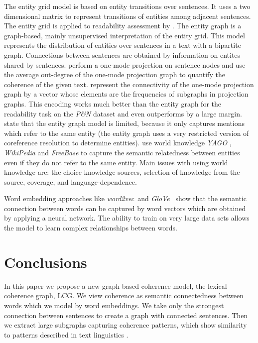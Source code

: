 The entity grid model \cite{barzilay08} is based on entity transitions
over sentences. It uses a two dimensional matrix to represent
transitions of entities among adjacent sentences. The entity grid is
applied to readability assessment by . The entity
graph \cite{guinaudeau13} is a graph-based, mainly unsupervised
interpretation of the entity grid. This model represents the
distribution of entities over sentences in a text with a bipartite
graph. Connections between sentences are obtained by information on
entites shared by sentences.  perform a one-mode
projection on sentence nodes and use the average out-degree of
the one-mode projection graph to quantify the coherence of the given
text.  represent the connectivity of the one-mode
projection graph by a vector whose elements are the frequencies of
subgraphs in projection graphs. This encoding works much better
than the entity graph for the readability task on the \emph{P\&N}
dataset and even outperforms  by a large margin.
 state that the entity graph model is limited,
because it only captures mentions which refer to the same entity (the
entity graph uses a very restricted version of coreference resolution
to determine entities).  use world knowledge
\emph{YAGO} \cite{hoffart13}, \emph{WikiPedia} \cite{denoyer06} and
\emph{FreeBase} \cite{bollacker08} to capture the semantic relatedness
between entities even if they do not refer to the same entity. Main
issues with using world knowledge are: the choice knowledge sources, selection of knowledge from the source, coverage, and language-dependence.

Word embedding approaches like \emph{word2vec}\ and \emph{GloVe}\
\cite{mikolov13c,pennington14} show that the semantic connection
between words can be captured by word vectors which are obtained by
applying a neural network. The ability to train on very
large data sets allows the model to learn complex relationships
between words.


\section{Conclusions}
\label{sec:lcg_conclusion}
%
In this paper we propose a new graph based coherence model, the
lexical coherence graph, LCG. We view coherence as semantic
connectedness between words which we model by word embeddings. We take
only the strongest connection between sentences to create a graph with
connected sentences. Then we extract large subgraphs capturing
coherence patterns, which show similarity to patterns described in
text linguistics \cite{danes74a}.

